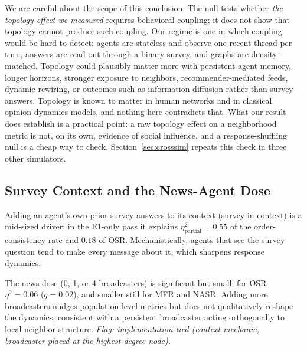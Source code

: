 \documentclass[letterpaper]{article} %
\begin{document}
We are careful about the scope of this conclusion. The null tests whether \emph{the topology effect we measured} requires behavioral coupling; it does not show that topology cannot produce such coupling. Our regime is one in which coupling would be hard to detect: agents are stateless and observe one recent thread per turn, answers are read out through a binary survey, and graphs are density-matched. Topology could plausibly matter more with persistent agent memory, longer horizons, stronger exposure to neighbors, recommender-mediated feeds, dynamic rewiring, or outcomes such as information diffusion rather than survey answers. Topology is known to matter in human networks and in classical opinion-dynamics models, and nothing here contradicts that. What our result does establish is a practical point: a raw topology effect on a neighborhood metric is not, on its own, evidence of social influence, and a response-shuffling null is a cheap way to check. Section~\ref{sec:crosssim} repeats this check in three other simulators.



\subsection{Survey Context and the News-Agent Dose}
\label{sec:context}

Adding an agent's own prior survey answers to its context (survey-in-context) is a mid-sized driver: in the E1-only pass it explains $\eta^2_{\text{partial}} = 0.55$ of the order-consistency rate and $0.18$ of OSR. Mechanistically, agents that see the survey question tend to make every message about it, which sharpens response dynamics.

The news dose (0, 1, or 4 broadcasters) is significant but small: for OSR $\eta^2 = 0.06$ ($q = 0.02$), and smaller still for MFR and NASR. Adding more broadcasters nudges population-level metrics but does not qualitatively reshape the dynamics, consistent with a persistent broadcaster acting orthogonally to local neighbor structure. \emph{Flag: implementation-tied (context mechanic; broadcaster placed at the highest-degree node).}
\end{document}
